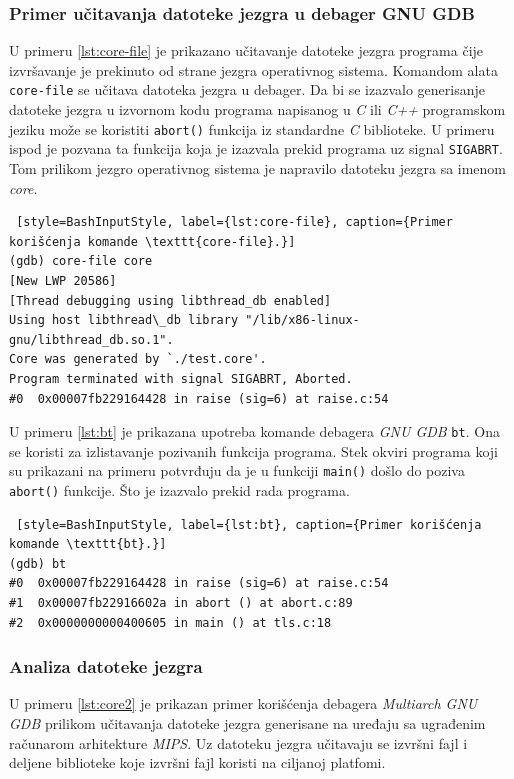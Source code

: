 \documentclass[12pt,oneside]{memoir}
\begin{document}
\subsubsection{Primer učitavanja datoteke jezgra u debager GNU GDB}

U primeru \ref{lst:core-file} je prikazano učitavanje datoteke jezgra programa čije izvršavanje je prekinuto od strane jezgra operativnog sistema. Komandom alata \texttt{core-file} se učitava datoteka jezgra u debager. Da bi se izazvalo generisanje datoteke jezgra u izvornom kodu programa napisanog u \emph{C} ili \emph{C++} programskom jeziku može se koristiti \texttt{abort()} funkcija iz standardne \emph{C} biblioteke. U primeru ispod je pozvana ta funkcija koja je izazvala prekid programa uz signal \texttt{SIGABRT}. Tom prilikom jezgro operativnog sistema je napravilo datoteku jezgra sa imenom \emph{core}.
\begin{lstlisting} [style=BashInputStyle, label={lst:core-file}, caption={Primer korišćenja komande \texttt{core-file}.}]
(gdb) core-file core
[New LWP 20586]
[Thread debugging using libthread_db enabled]
Using host libthread\_db library "/lib/x86-linux-gnu/libthread_db.so.1".
Core was generated by `./test.core'.
Program terminated with signal SIGABRT, Aborted.
#0  0x00007fb229164428 in raise (sig=6) at raise.c:54
\end{lstlisting}


U primeru \ref{lst:bt} je prikazana upotreba komande debagera \emph{GNU GDB} \texttt{bt}. Ona se koristi za izlistavanje pozivanih funkcija programa. Stek okviri programa koji su prikazani na primeru potvrđuju da je u funkciji \texttt{main()} došlo do poziva \texttt{abort()} funkcije. Što je izazvalo prekid rada programa.

\begin{lstlisting} [style=BashInputStyle, label={lst:bt}, caption={Primer korišćenja komande \texttt{bt}.}]
(gdb) bt
#0  0x00007fb229164428 in raise (sig=6) at raise.c:54
#1  0x00007fb22916602a in abort () at abort.c:89
#2  0x0000000000400605 in main () at tls.c:18
\end{lstlisting}

\subsubsection{Analiza datoteke jezgra}

U primeru \ref{lst:core2} je prikazan primer korišćenja debagera \emph{Multiarch GNU GDB} prilikom učitavanja datoteke jezgra generisane na uređaju sa ugrađenim računarom arhitekture \emph{MIPS}. Uz datoteku jezgra učitavaju se izvršni fajl i deljene biblioteke koje izvršni fajl koristi na ciljanoj platfomi.
\end{document}
